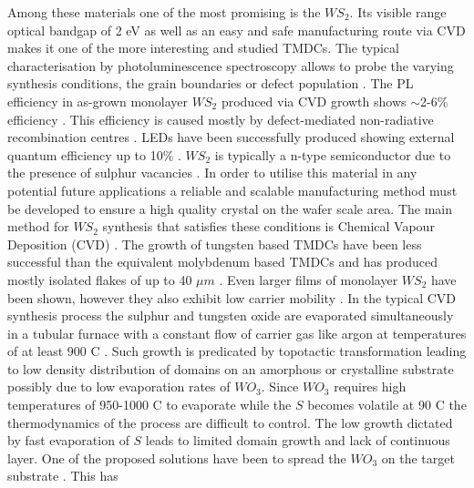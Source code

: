 Among these materials one of the most promising is the $WS_2$. Its visible range optical bandgap of 2 eV as well as an easy and safe manufacturing route via CVD makes it one of the more interesting and studied TMDCs. The typical characterisation by photoluminescence spectroscopy allows to probe the varying synthesis conditions, the grain boundaries or defect population \cite{ExtraordinaryRoomTemperaturePhotoluminescenceInTriangularWS2Monolayers} \cite{doi:10.1021/nn4046002} \cite{Li2015} \cite{Rong2014}. The PL efficiency in as-grown monolayer $WS_2$ produced via CVD growth shows {$\sim$}2-6\% efficiency \cite{doi:10.1021/nn4046002}\cite{Yuan2015} \cite{doi:10.1021/nn403682r}. This efficiency is caused mostly by defect-mediated non-radiative recombination centres \cite{Amani2015}. LEDs have been successfully produced \cite{doi:10.1021/nl500171v} showing external quantum efficiency up to 10\% \cite{Zeng2016}\cite{Withers2015}. $WS_2$ is typically a n-type semiconductor due to the presence of sulphur vacancies \cite{ExtraordinaryRoomTemperaturePhotoluminescenceInTriangularWS2Monolayers}\cite{doi:10.1021/nn5059908}\cite{Iqbal2015}. In order to utilise this material in any potential future applications a reliable and scalable manufacturing method must be developed to ensure a high quality crystal on the wafer scale area. The main method for $WS_2$ synthesis that satisfies these conditions is Chemical Vapour Deposition (CVD) \cite{Hofmann1988}. The growth of tungsten based TMDCs have been less successful than the equivalent molybdenum based TMDCs and has produced mostly isolated flakes of up to 40 $\mu m$ \cite{ExtraordinaryRoomTemperaturePhotoluminescenceInTriangularWS2Monolayers} \cite{doi:10.1021/nn403454e} \cite{Rong2014} \cite{doi:10.1021/nn400971k}\cite{doi:10.1021/acsnano.5b01480}\cite{Fu2015}\cite{Lee2013}. Even larger films of monolayer $WS_2$ have been shown, however they also exhibit low carrier mobility \cite{Kang2015}\cite{Gao2015}. In the typical CVD synthesis process the sulphur and tungsten oxide are evaporated simultaneously in a tubular furnace with a constant flow of carrier gas like argon at temperatures of at least 900 {\degree}C \cite{ExtraordinaryRoomTemperaturePhotoluminescenceInTriangularWS2Monolayers}\cite{doi:10.1021/nn403454e}\cite{Rong2014}\cite{doi:10.1021/nn400971k}\cite{doi:10.1021/acsnano.5b01480}\cite{Fu2015}\cite{Lee2013}. Such growth is predicated by topotactic transformation leading to low density distribution of domains on an amorphous \cite{ExtraordinaryRoomTemperaturePhotoluminescenceInTriangularWS2Monolayers}\cite{doi:10.1021/nn403454e}\cite{doi:10.1021/nn400971k}\cite{Fu2015}\cite{Lee2013} or crystalline substrate \cite{Rong2014}\cite{doi:10.1021/acsnano.5b01480}\cite{doi:10.1021/nn503093k} possibly due to low evaporation rates of $WO_3$. Since $WO_3$ requires high temperatures of 950-1000 {\degree}C to evaporate while the $S$ becomes volatile at 90 {\degree}C the thermodynamics of the process are difficult to control. The low growth dictated by fast evaporation of $S$ leads to limited domain growth and lack of continuous layer. One of the proposed solutions have been to spread the $WO_3$ on the target substrate \cite{doi:10.1021/nn4046002}\cite{Li2015}\cite{Gao2015}\cite{Cong2013}\cite{Yun2015}\cite{Gong2015}\cite{Gong2014}. This has 